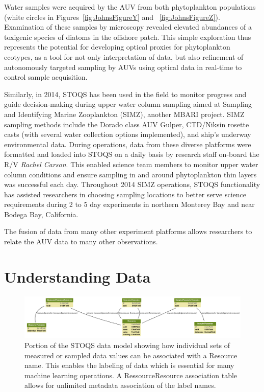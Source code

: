 \documentclass[conference]{IEEEtran}
\begin{document}
Water samples were acquired by the AUV from both phytoplankton populations (white circles in Figures~\ref{fig:JohnsFigureY} and ~\ref{fig:JohnsFigureZ}).  Examination of these samples by microscopy revealed elevated abundances of a toxigenic species of diatoms in the offshore patch.  This simple exploration thus represents the potential for developing optical proxies for phytoplankton ecotypes, as a tool for not only interpretation of data, but also refinement of autonomously targeted sampling by AUVs using optical data in real-time to control sample acquisition.


Similarly, in 2014, STOQS has been used in the field to monitor progress and guide decision-making during upper water column sampling aimed at Sampling and Identifying Marine Zooplankton (SIMZ), another MBARI project.  SIMZ sampling methods include the Dorado class AUV Gulper, CTD/Niksin rosette casts (with several water collection options implemented), and ship’s underway environmental data.  During operations, data from these diverse platforms were formatted and loaded into STOQS on a daily basis by research staff on-board the R/V \textit{Rachel Carson}.  This enabled science team members to monitor upper water column conditions and ensure sampling in and around phytoplankton thin layers was successful each day. Throughout 2014 SIMZ operations, STOQS functionality has assisted researchers in choosing sampling locations to better serve science requirements during 2 to 5 day experiments in northern Monterey Bay and near Bodega Bay, California.

The fusion of data from many other experiment platforms allows researchers to relate the AUV data to many other observations.

\section{Understanding Data}


\begin{figure}[htbp]
\centering
\includegraphics[width=0.9\linewidth]{stoqs_simple_model_labels.png}
\caption{Portion of the STOQS data model showing how individual sets of measured or sampled data values can be associated with a Resource name. This enables the labeling of data which is essential for many machine learning operations. A RessourceResource association table allows for unlimited metadata association of the label names.}
\label{fig:stoqs_simple_model_labels}
\end{figure}
\end{document}
